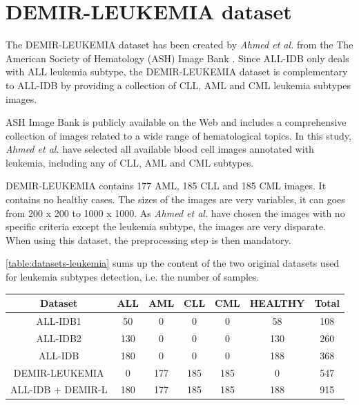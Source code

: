 \documentclass[11pt, openany]{report}
\theoremstyle{plain}
\theoremstyle{definition}
\theoremstyle{remark}
\begin{document}
\newpage
\section{DEMIR-LEUKEMIA dataset} \label{sec:demir-leukemia}
The DEMIR-LEUKEMIA dataset has been created by \textit{Ahmed et al.} \cite{leukemia} from the The American Society of Hematology (ASH) Image Bank \cite{ASH}. Since ALL-IDB only deals with ALL leukemia subtype, the DEMIR-LEUKEMIA dataset is complementary to ALL-IDB by providing a collection of CLL, AML and CML leukemia subtypes images.  

ASH Image Bank is publicly available on the Web and includes a comprehensive collection of
images related to a wide range of hematological topics. In this study, \textit{Ahmed et al.} have selected all available blood cell images annotated with leukemia, including any of CLL, AML and CML subtypes. 

DEMIR-LEUKEMIA contains 177 AML, 185 CLL and 185 CML images. It contains no healthy cases. The sizes of the images are very variables, it can goes from 200 x 200 to 1000 x 1000. As \textit{Ahmed et al.} have chosen the images with no specific criteria except the leukemia subtype, the images are very disparate. When using this dataset, the preprocessing step is then mandatory. 

\autoref{table:datasets-leukemia} sums up the content of the two original datasets used for leukemia subtypes detection, i.e. the number of samples. 

\begin{center}
    \begin{tabular}{|c|c|c|c|c|c|c|}
      \hline
      \textbf{Dataset} & \textbf{ALL} & \textbf{AML} & \textbf{CLL} & \textbf{CML} & \textbf{HEALTHY} & \textbf{Total}\\
      \hline
      ALL-IDB1 & 50 & 0 & 0 & 0 & 58 & 108  \\
      \hline
      ALL-IDB2 & 130 & 0 & 0 & 0 & 130 & 260  \\
      \hline
      ALL-IDB & 180 & 0 & 0 & 0 & 188 & 368  \\
      \hline
      DEMIR-LEUKEMIA & 0 & 177 & 185 & 185 & 0 & 547  \\
      \hline
      \hline
      ALL-IDB + DEMIR-L & 180 & 177 & 185 & 185 & 188 & 915 \\ 
      \hline
    \end{tabular}
    \label{table:datasets-leukemia}
\end{center} 
\end{document}
